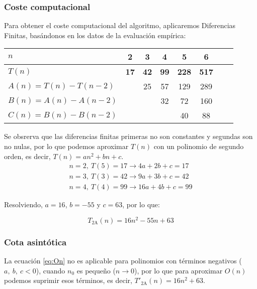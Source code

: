\subsubsection*{Coste computacional}


Para obtener el coste computacional del algoritmo, aplicaremos Diferencias Finitas, basándonos en los datos de la evaluación empírica:


\begin{table}[h]
    \centering
    \begin{tabular}{|l|c|c|c|c|c|c|c|}
        \hline
        $n$ & \textbf{2} & \textbf{3} & \textbf{4} & \textbf{5} & \textbf{6}\\ \hline
        $T(n)$ & \textbf{17} & \textbf{42} & \textbf{99} & \textbf{228} & \textbf{517}      \\ \hline
        \hline
        $A(n) = T(n) - T(n-2)$ &    & 25 & 57 & 129 & 289 \\ \hline
        $B(n) = A(n) - A(n-2)$ &    &   & 32 & 72 & 160 \\ \hline
        $C(n) = B(n) - B(n-2)$ &    &   &    & 40 & 88 \\ \hline
    \end{tabular}
\end{table}

Se obsrerva que las diferencias finitas primeras no son constantes y segundas son no nulas, por lo que podemos aproximar $T(n)$ con un polinomio de segundo orden, es decir, $T(n) =  an^2 + bn + c$.\\

\begin{subequations}
    \begin{gather}
        n = 2,\ T(5) = 17 \rightarrow 4a + 2b + c = 17 \\
        n = 3,\ T(3) = 42 \rightarrow 9a + 3b + c = 42 \\
        n = 4,\ T(4) = 99 \rightarrow 16a + 4b + c = 99
    \end{gather}
\end{subequations}

Resolviendo, $a=16$, $b=-55$ y $c=63$, por lo que:

\begin{equation}
    T_{\mathrm{2A}}(n) = 16n^2 - 55n + 63
\end{equation}


\subsubsection*{Cota asintótica}
La ecuación \ref{eq:On} no es aplicable para polinomios con términos negativos ($a,\ b,\ c < 0$), cuando $n_0$ es pequeño ($n \rightarrow 0$), por lo que para aproximar $O(n)$ podemos suprimir esos términos, es decir, $T'_{\mathrm{2A}}(n) = 16n^2 + 63$.

